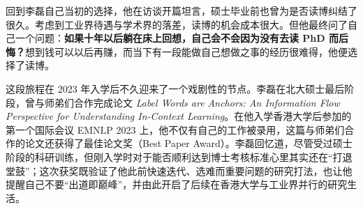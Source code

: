 \documentclass[UTF8,a4paper,11pt,fontset=fandol]{ctexart}
\begin{document}
回到李磊自己当初的选择，他在访谈开篇坦言，硕士毕业前也曾为是否读博纠结了很久。考虑到工业界待遇与学术界的落差，读博的机会成本很大。但他最终问了自己一个问题：\textbf{如果十年以后躺在床上回想，自己会不会因为没有去读 PhD 而后悔？}想到钱可以以后再赚，而当下有一段能做自己想做之事的经历很难得，他便选择了读博。

这段旅程在 2023 年入学后不久迎来了一个戏剧性的节点。李磊在北大硕士最后阶段，曾与师弟们合作完成论文 \textit{Label Words are Anchors: An Information Flow Perspective for Understanding In-Context Learning}。在他入学香港大学后参加的第一个国际会议 EMNLP 2023 上，他不仅有自己的工作被录用，这篇与师弟们合作的论文还获得了最佳论文奖（Best Paper Award）。李磊回忆道，尽管受过硕士阶段的科研训练，但刚入学时对于能否顺利达到博士考核标准心里其实还在“打退堂鼓”；这次获奖既验证了他此前快速迭代、选难而重要问题的研究打法，也让他提醒自己不要“出道即巅峰”，并由此开启了后续在香港大学与工业界并行的研究生活。
\end{document}
